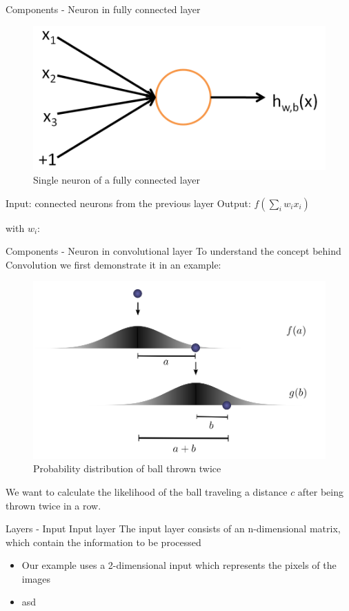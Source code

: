 \documentclass[12pt]{beamer}
\begin{document}
\begin{frame}{Components - Neuron in fully connected layer}

\begin{figure}
\centering
\includegraphics[width = 0.4\linewidth]{images/SingleNeuron.png}
\caption{Single neuron of a fully connected layer}
\label{fig:principle}
\end{figure}
Input: connected neurons from the previous layer \newline
Output: $f (\sum_{i}{w_i x_i})$

with \newline
$w_i$: 
\end{frame}




\begin{frame}{Components - Neuron in convolutional layer}
To understand the concept behind Convolution we first demonstrate it in an example:
\begin{figure}
\centering
\includegraphics[width = 0.4\linewidth]{images/convprob.png}
\caption{Probability distribution of ball thrown twice}
\label{fig:principle}
\end{figure}
We want to calculate the likelihood of the ball traveling a distance $c$ after being thrown twice in a row. \newline


\end{frame}
\begin{frame}{Layers - Input}
\huge
Input layer
\newline
\normalsize
The input layer consists of an n-dimensional matrix, which contain the information to be processed

\begin{itemize}
\item Our example uses a 2-dimensional input which represents the pixels of the images
\item asd
\end{itemize}



\end{frame}
\end{document}
